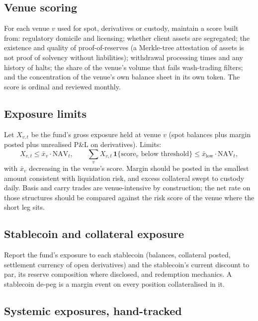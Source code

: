 \documentclass[11pt,a4paper]{article}
\theoremstyle{definition}
\newcommand{\ind}{\mathbf{1}}
\begin{document}
\subsection{Venue scoring}

For each venue $v$ used for spot, derivatives or custody, maintain a score built from: regulatory domicile and licensing; whether client assets are segregated; the existence and quality of proof-of-reserves (a Merkle-tree attestation of assets is not proof of solvency without liabilities); withdrawal processing times and any history of halts; the share of the venue's volume that fails wash-trading filters; and the concentration of the venue's own balance sheet in its own token. The score is ordinal and reviewed monthly.

\subsection{Exposure limits}

Let $X_{v,t}$ be the fund's gross exposure held at venue $v$ (spot balances plus margin posted plus unrealised P\&L on derivatives). Limits:
\begin{equation}
X_{v,t} \le \bar{x}_{v}\cdot \mathrm{NAV}_t, \qquad \sum_v X_{v,t}\,\ind\{\text{score}_v \text{ below threshold}\} \le \bar{x}_{\mathrm{low}}\cdot\mathrm{NAV}_t,
\end{equation}
with $\bar{x}_v$ decreasing in the venue's score. Margin should be posted in the smallest amount consistent with liquidation risk, and excess collateral swept to custody daily. Basis and carry trades are venue-intensive by construction; the net rate on those structures should be compared against the risk score of the venue where the short leg sits.

\subsection{Stablecoin and collateral exposure}

Report the fund's exposure to each stablecoin (balances, collateral posted, settlement currency of open derivatives) and the stablecoin's current discount to par, its reserve composition where disclosed, and redemption mechanics. A stablecoin de-peg is a margin event on every position collateralised in it.

\subsection{Systemic exposures, hand-tracked}
\end{document}
